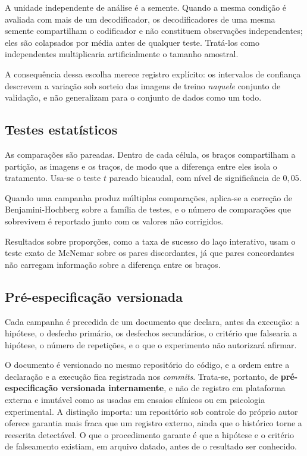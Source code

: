 A unidade independente de análise é a semente. Quando a mesma condição é avaliada com mais de um decodificador, os decodificadores de uma mesma semente compartilham o codificador e não constituem observações independentes; eles são colapsados por média antes de qualquer teste. Tratá-los como independentes multiplicaria artificialmente o tamanho amostral.

A consequência dessa escolha merece registro explícito: os intervalos de confiança descrevem a variação sob sorteio das imagens de treino \emph{naquele} conjunto de validação, e não generalizam para o conjunto de dados como um todo.

\subsection{Testes estatísticos}

As comparações são pareadas. Dentro de cada célula, os braços compartilham a partição, as imagens e os traços, de modo que a diferença entre eles isola o tratamento. Usa-se o teste $t$ pareado bicaudal, com nível de significância de $0{,}05$.

Quando uma campanha produz múltiplas comparações, aplica-se a correção de Benjamini-Hochberg sobre a família de testes, e o número de comparações que sobrevivem é reportado junto com os valores não corrigidos.

Resultados sobre proporções, como a taxa de sucesso do laço interativo, usam o teste exato de McNemar sobre os pares discordantes, já que pares concordantes não carregam informação sobre a diferença entre os braços.

\subsection{Pré-especificação versionada}
\label{sec_prereg}

Cada campanha é precedida de um documento que declara, antes da execução: a hipótese, o desfecho primário, os desfechos secundários, o critério que falsearia a hipótese, o número de repetições, e o que o experimento não autorizará afirmar.

O documento é versionado no mesmo repositório do código, e a ordem entre a declaração e a execução fica registrada nos \emph{commits}. Trata-se, portanto, de \textbf{pré-especificação versionada internamente}, e não de registro em plataforma externa e imutável como as usadas em ensaios clínicos ou em psicologia experimental. A distinção importa: um repositório sob controle do próprio autor oferece garantia mais fraca que um registro externo, ainda que o histórico torne a reescrita detectável. O que o procedimento garante é que a hipótese e o critério de falseamento existiam, em arquivo datado, antes de o resultado ser conhecido.

